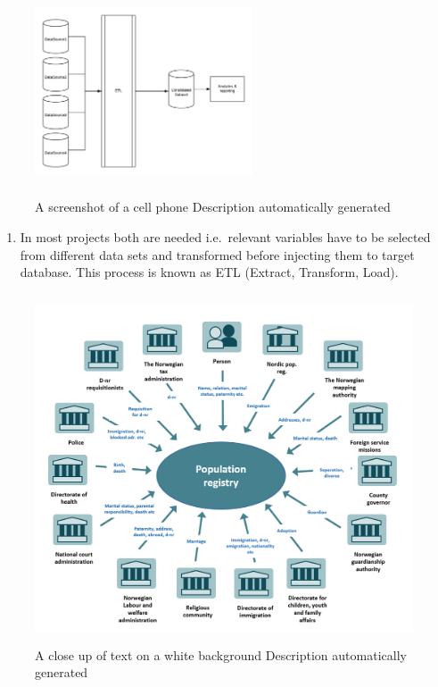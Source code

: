 \documentclass[
]{article}
\providecommand{\tightlist}{%
  \setlength{\itemsep}{0pt}\setlength{\parskip}{0pt}}
\begin{document}
\begin{figure}
\centering
\includegraphics[width=2.54514in,height=2.41528in]{media/image22.png}
\caption{A screenshot of a cell phone Description automatically
generated}
\end{figure}

\begin{enumerate}
\def\labelenumi{\arabic{enumi}.}
\setcounter{enumi}{217}
\tightlist
\item
  In most projects both are needed i.e.~relevant variables have to be
  selected from different data sets and transformed before injecting
  them to target database. This process is known as ETL (Extract,
  Transform, Load).
\end{enumerate}

\begin{figure}
\centering
\includegraphics[width=6.29861in,height=4.06528in]{media/image23.png}
\caption{A close up of text on a white background Description automatically
generated}
\end{figure}
\end{document}
